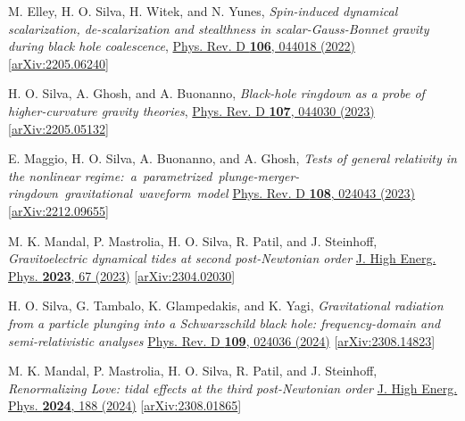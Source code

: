 \documentclass[10pt]{article}
\begin{document}
\begin{bibenum}
    \item M. Elley, H. O. Silva, H. Witek, and N. Yunes,
    \emph{Spin-induced dynamical scalarization, de-scalarization and stealthness in scalar-Gauss-Bonnet gravity during black hole coalescence},
    \href{https://journals.aps.org/prd/abstract/10.1103/PhysRevD.106.044018}{Phys. Rev. D {\bf 106}, 044018 (2022)}
    [\href{https://arxiv.org/abs/2205.06240}{arXiv:2205.06240}]

    \item H. O. Silva, A. Ghosh, and A. Buonanno,
    \emph{Black-hole ringdown as a probe of higher-curvature gravity theories},
    \href{https://journals.aps.org/prd/abstract/10.1103/PhysRevD.107.044030}{Phys. Rev. D {\bf 107}, 044030 (2023)}
    [\href{https://arxiv.org/abs/2212.09655}{arXiv:2205.05132}]

    \item E. Maggio, H. O. Silva, A. Buonanno, and A. Ghosh,
    \emph{Tests of general relativity in the nonlinear regime:~a~parametrized~plunge-merger-ringdown~gravitational~waveform~model}
    \href{https://link.aps.org/doi/10.1103/PhysRevD.108.024043}{Phys. Rev. D {\bf 108}, 024043 (2023)}
    [\href{https://arxiv.org/abs/2212.09655}{arXiv:2212.09655}]

    \item M. K. Mandal, P. Mastrolia, H. O. Silva, R. Patil, and J. Steinhoff,
    \emph{Gravitoelectric dynamical tides at second post-Newtonian order }
    \href{https://link.springer.com/article/10.1007/JHEP11(2023)067}{J. High Energ. Phys. {\bf 2023}, 67 (2023)}
    [\href{https://arxiv.org/abs/2304.02030}{arXiv:2304.02030}]

    \item H. O. Silva, G. Tambalo, K. Glampedakis, and K. Yagi,
    \emph{Gravitational radiation from a particle plunging into a Schwarzschild black hole: frequency-domain and semi-relativistic analyses}
    \href{https://journals.aps.org/prd/abstract/10.1103/PhysRevD.109.024036}{Phys. Rev. D {\bf 109}, 024036 (2024)}
    [\href{https://arxiv.org/abs/2308.14823}{arXiv:2308.14823}]

    \item M. K. Mandal, P. Mastrolia, H. O. Silva, R. Patil, and J. Steinhoff,
    \emph{Renormalizing Love: tidal effects at the third post-Newtonian order}
    \href{https://link.springer.com/article/10.1007/JHEP02(2024)188}{J. High Energ. Phys. {\bf 2024}, 188 (2024)}
    [\href{https://arxiv.org/abs/2308.01865}{arXiv:2308.01865}]
\end{bibenum}
\end{document}
